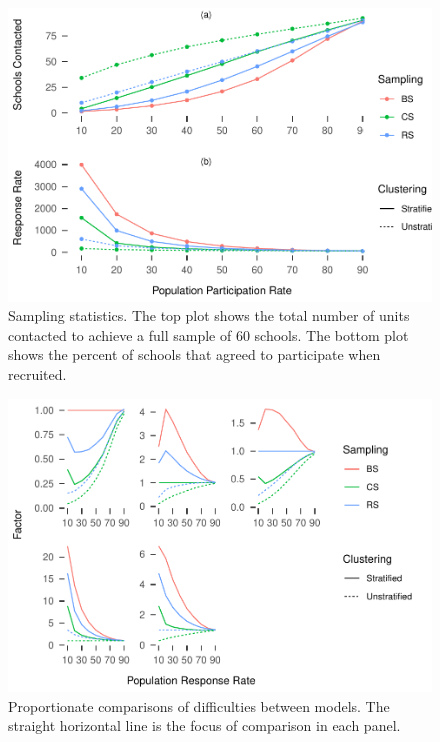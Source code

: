 \documentclass[man,floatsintext]{apa6}
\begin{document}
\begin{figure}
\centering
\includegraphics{GenSamp_Paper_files/figure-latex/fig-responses-1.pdf}
\caption{\label{fig:fig-responses}Sampling statistics. The top plot shows the total number of units contacted to achieve a full sample of 60 schools. The bottom plot shows the percent of schools that agreed to participate when recruited.}
\end{figure}



\begin{figure}
\centering
\includegraphics{GenSamp_Paper_files/figure-latex/fig-comp-1.pdf}
\caption{\label{fig:fig-comp}Proportionate comparisons of difficulties between models. The straight horizontal line is the focus of comparison in each panel.}
\end{figure}
\end{document}
